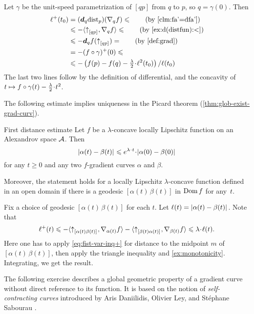 Let $\gamma$ be the unit-speed parametrization of $[qp]$ from $q$ to $p$, so $q=\gamma(0)$.
Then 
\begin{align*}
\ell^+(t_0)&=(\dd_q\distfun_p)(\nabla_qf)\le\tag{by \ref{clm:fa'=dfa'}}
\\
&\le -\langle\dir qp,\nabla_qf\rangle \le \tag{by \ref{ex:d(distfun):<}}
\\
&\le -\dd_qf(\dir qp)=\tag{by \ref{def:grad}}
\\
&=-(f\circ\gamma)^+(0)\le 
\\
&\le -\left({f(p)}-{f(q)}-\tfrac\lambda2\cdot\ell^2(t_0)\right)/\ell(t_0)
\end{align*}
The last two lines follow by
the definition of differential,
and the concavity of $t\z\mapsto f\circ\gamma(t)-\tfrac \lambda2\cdot {t^2}$.
\qeds

The following estimate implies uniqueness in the Picard theorem (\ref{thm:glob-exist-grad-curv}).

\begin{thm}{First distance estimate}\label{thm:dist-est}
Let $f$ be a $\lambda$-concave locally Lipschitz function on an Alexandrov space $\mathcal{A}$.
Then
\[\dist{\alpha(t)}{\beta(t)}{}
\le 
e^{\lambda\cdot t}\cdot\dist[{{}}]{\alpha(0)}{\beta(0)}{}\]
for any $t\ge 0$ and any two $f$-gradient curves $\alpha$ and $\beta$.

Moreover, the statement holds for a locally Lipschitz $\lambda$-concave function defined in an open domain if there is a geodesic $[\alpha(t)\,\beta(t)]$ in $\mathop{\rm Dom}\nolimits f$ for any~$t$.
\end{thm}

Fix a choice of geodesic $[\alpha(t)\,\beta(t)]$ for each $t$.
Let $\ell(t)=|{\alpha(t)}-{\beta(t)}|_{}^{{}}$. 
Note that
\[\ell^+(t)
\le-
\<\dir{\alpha(t)}{\beta(t)},\nabla_{\alpha(t)}f\>-\<\dir{\beta(t)}{\alpha(t)},\nabla_{\beta(t)}f\>
\le
\lambda\cdot\ell(t).\]
Here one has to apply \ref{eq:fist-var-inq+} for distance to the midpoint $m$ of $[\alpha(t)\,\beta(t)]$, then apply the triangle inequality and \ref{ex:monotonicity}.
Integrating, we get the result.
\qeds



The following exercise describes a global geometric property of a gradient curve without direct reference to its function.
It is based on the notion of \emph{self-contracting curves} introduced by Aris Daniilidis, Olivier Ley, and Stéphane Sabourau \cite{daniilidis-ley-sabourau}.

